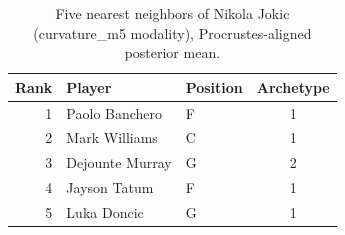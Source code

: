 \begin{table}[htbp]
  \centering\small
  \begin{tabular}{rllc}
    \toprule
    Rank & Player & Position & Archetype \\
    \midrule
    1 & Paolo Banchero & F & 1 \\
    2 & Mark Williams & C & 1 \\
    3 & Dejounte Murray & G & 2 \\
    4 & Jayson Tatum & F & 1 \\
    5 & Luka Doncic & G & 1 \\
    \bottomrule
  \end{tabular}
  \caption{Five nearest neighbors of Nikola Jokic (curvature_m5 modality), Procrustes-aligned posterior mean.}
  \label{tab:Nikola_Jokic_neighbors_curvature_m5}
\end{table}

